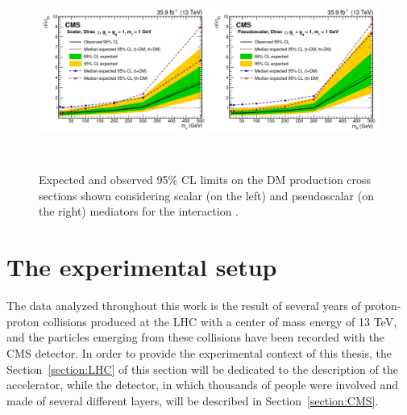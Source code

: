 \documentclass[a4paper, 10pt, openright]{report}
\begin{document}
\begin{figure}[htbp]
\begin{center}
\includegraphics[width=16cm, height=6.5cm]{figs/Combination2019.png}
\caption{Expected and observed 95\% \ac{CL} limits on the \ac{DM} production cross sections shown considering scalar (on the left) and pseudoscalar (on the right) mediators for the interaction \cite{PreviousSingleDoubleTopAllLep13CMS}.}
\label{figure:Combination2019}
\end{center}
\end{figure}



























\chapter{The experimental setup} \label{chapter:Device}

The data analyzed throughout this work is the result of several years of proton-proton collisions produced at the \ac{LHC} with a center of mass energy of 13 TeV, and the particles emerging from these collisions have been recorded with the \ac{CMS} detector. In order to provide the experimental context of this thesis, the Section~\ref{section:LHC} of this section will be dedicated to the description of the accelerator, while the detector, in which thousands of people were involved and made of several different layers, will be described in Section~\ref{section:CMS}.
\end{document}
